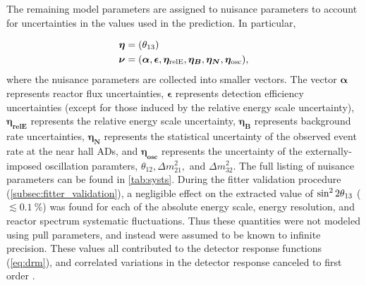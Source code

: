 The remaining model parameters
are assigned to nuisance parameters
to account for uncertainties in the values used in the prediction.
In particular,

\begin{align}
    \begin{split}
        \boldsymbol{\eta} &= (\theta_{13}) \\
        \boldsymbol{\nu} &= (
            \boldsymbol{\alpha},
            \boldsymbol{\epsilon},
            \boldsymbol{\eta_{\text{relE}}},
            \boldsymbol{\eta_B},
            \boldsymbol{\eta_N},
            \boldsymbol{\eta_{\text{osc}}}),
    \end{split}
\end{align}
where the nuisance parameters are collected into smaller vectors.
The vector $\boldsymbol{\alpha}$ represents reactor flux uncertainties,
$\boldsymbol{\epsilon}$ represents detection efficiency uncertainties
(except for those induced by the relative energy scale uncertainty),
$\boldsymbol{\eta_{\text{relE}}}$ represents the relative energy scale uncertainty,
$\boldsymbol{\eta_B}$ represents background rate uncertainties,
$\boldsymbol{\eta_N}$ represents the statistical uncertainty
of the observed event rate at the near hall ADs,
and $\boldsymbol{\eta_{\text{osc}}}$ represents the uncertainty
of the externally-imposed oscillation paramters, $\theta_{12}, \Delta m^2_{21},$
and $\Delta m^2_{32}${}.
The full listing of nuisance parameters
can be found in \cref{tab:systs}.
During the fitter validation procedure (\cref{subsec:fitter_validation}),
a negligible effect on the extracted value of $\sin^22\theta_{13}$
($\lesssim\SI{0.1}{\percent}$)
was found for each of the absolute energy scale, energy resolution,
and reactor \nuebar{} spectrum systematic fluctuations.
Thus these quantities were not modeled using pull parameters,
and instead were assumed to be known to infinite precision.
These values all contributed to the detector response functions
(\cref{eq:drm}),
and correlated variations in the detector response
canceled to first order .

